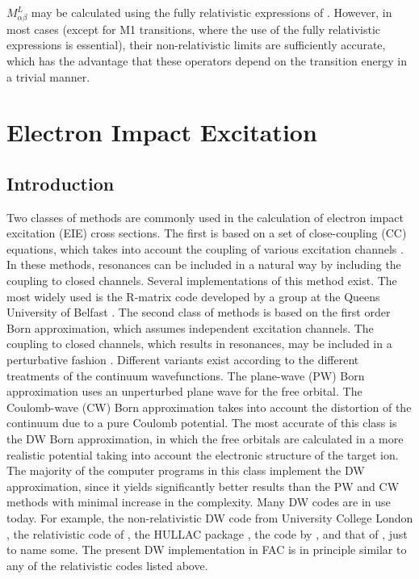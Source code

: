 $M^L_{\alpha\beta}$ may be calculated using the fully relativistic
expressions of \citet{grant74}. However, in most cases (except for M1
transitions, where the use of the fully relativistic expressions is
essential), their non-relativistic 
limits are sufficiently accurate, which has the advantage that these operators
depend on the transition energy in a trivial manner. 


\section{Electron Impact Excitation}
\label{sec:eie}
\subsection{Introduction}
Two classes of methods are commonly used in the calculation of electron impact
excitation (EIE) cross
sections. The first is based on a set of close-coupling (CC) equations, which
takes into account the coupling of various excitation channels
\cite{seaton75}. In these methods, resonances can be included in a
natural way by including the coupling to closed channels. Several
implementations of this method exist. The most widely used is the R-matrix
code developed by a group at the Queens University of Belfast
\cite{berrington95}. The second class of methods is based on the first order
Born approximation, which assumes independent excitation channels. The
coupling to closed channels, which results in resonances, may be included in a
perturbative fashion \cite{eissner72}. Different variants exist according to
the different treatments of the continuum wavefunctions. The plane-wave (PW)
Born approximation uses an unperturbed plane wave for the free orbital. The
Coulomb-wave (CW) Born approximation takes into account the distortion of the
continuum due to a pure Coulomb potential. The most accurate of this class is
the DW Born approximation, in which the free orbitals are
calculated in a more realistic potential taking into account the electronic
structure of the target ion.
The majority of the computer programs in this class implement the DW
approximation, since it yields significantly better results than the PW and CW
methods with minimal increase in the complexity. Many DW codes are in use
today. For example, the non-relativistic DW code from University College
London \cite{eissner98}, the relativistic code of \citet{hagelstein87}, the
HULLAC package \cite{barshalom:1988a}, the code by \citet{zhang89}, and that of
\citet{chen96}, just to name some. The present DW implementation in FAC is
in principle similar to any of the relativistic codes listed above.

